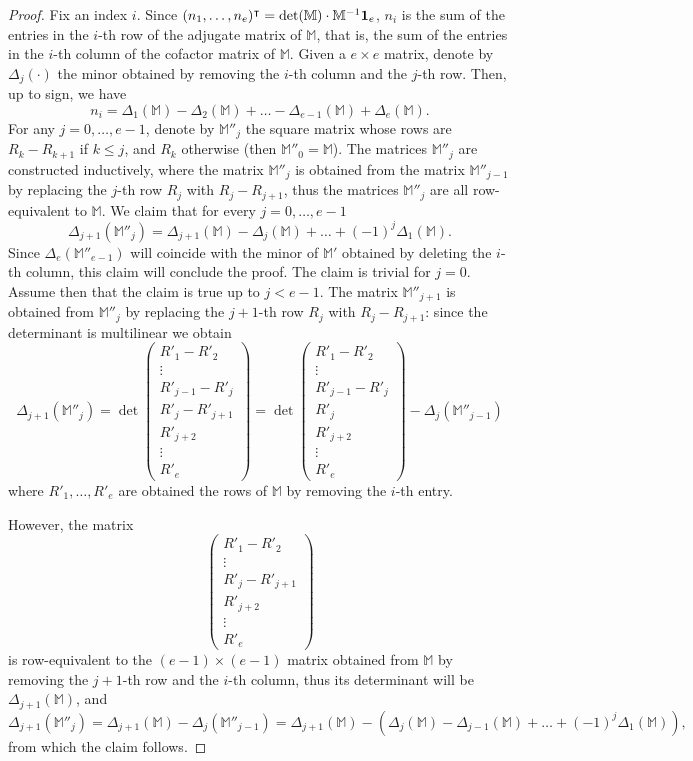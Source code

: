\documentclass[11pt,twoside]{amsart}
\newcommand{\MM}{\mathbb M}
\def\bbM{{\mathbb M}}
\theoremstyle{definition}
\numberwithin{equation}{section}
\begin{document}
\begin{proof}
Fix an index $i$. Since $(n_1, \ldots , n_e)^\intercal = \det(\bbM) \cdot \bbM^{-1}{\bf 1}_e$, $n_i$ is the sum of the entries in the $i$-th row of the adjugate matrix of $\MM$, that is, the sum of the entries in the $i$-th column of the cofactor matrix of $\MM$. 
Given a $e \times e$ matrix, denote by $\Delta_j(\cdot)$ the minor obtained by removing the $i$-th column and the $j$-th row. Then, up to sign, we have 
$$n_i = \Delta_1(\MM) - \Delta_2(\MM) +  \ldots - \Delta_{e-1}(\MM)+ \Delta_e(\MM).$$
For any $j=0,\ldots,e-1$, denote by $\MM''_j$ the square matrix whose rows are $R_k-R_{k+1}$ if $k \le j$, and $R_k$ otherwise (then $\MM''_0=\MM$). The matrices $\MM''_j$ are constructed inductively, 
where the matrix $\MM''_j$ is obtained from the matrix $\MM''_{j-1}$ by replacing the $j$-th row $R_j$ with $R_j-R_{j+1}$, 
thus the matrices $\MM''_j$ are all row-equivalent to $\MM$. We claim that for every $j=0,\ldots,e-1$
$$\Delta_{j+1}(\MM''_j)=\Delta_{j+1}(\MM)-\Delta_j(\MM)+\ldots+ (-1)^j\Delta_1(\MM).$$
Since $\Delta_e(\MM''_{e-1})$ will coincide with the minor of $\MM'$ obtained by deleting the $i$-th column, this claim will conclude the proof. 
The claim is trivial for $j=0$.
Assume then that the claim is true up to $j < e-1$. The matrix $\MM''_{j+1}$ is obtained from $\MM''_j$ by replacing the $j+1$-th row $R_j$ with $R_j-R_{j+1}$: since the determinant is multilinear we obtain
$$\Delta_{j+1}(\MM''_j)=\det 
\begin{pmatrix} 
R'_1-R'_2 \\
\vdots \\
R'_{j-1}-R'_j \\
R'_j-R'_{j+1} \\
R'_{j+2} \\
\vdots \\ 
R'_e
\end{pmatrix} = \det 
\begin{pmatrix} 
R'_1-R'_2 \\
\vdots \\
R'_{j-1}-R'_j \\
R'_j \\
R'_{j+2} \\
\vdots \\ 
R'_e
\end{pmatrix} - \Delta_j(\MM''_{j-1})$$
where $R'_1,\ldots,R'_e$ are obtained the rows of $\MM$ by removing the $i$-th entry.

However, the matrix $$\begin{pmatrix} 
R'_1-R'_2 \\
\vdots \\
R'_j-R'_{j+1} \\
R'_{j+2} \\
\vdots \\ 
R'_e
\end{pmatrix}$$
is row-equivalent to the $(e-1) \times (e-1)$ matrix obtained from $\MM$ by removing the $j+1$-th row and the $i$-th column, thus its determinant will be $\Delta_{j+1}(\MM)$, and
$$\Delta_{j+1}(\MM''_j)=\Delta_{j+1}(\MM)-\Delta_j(\MM''_{j-1})=\Delta_{j+1}(\MM)- (\Delta_j(\MM)-\Delta_{j-1}(\MM) + \ldots + (-1)^j \Delta_1(\MM)),$$
from which the claim follows.
\end{proof}
\end{document}
